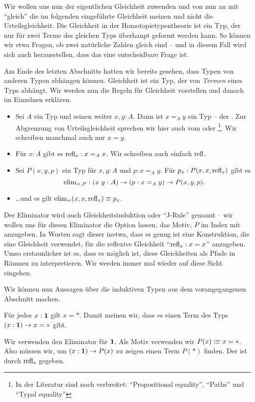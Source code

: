 Wir wollen uns nun der eigentlichen Gleichheit zuwenden und von nun an mit ``gleich'' die im folgenden eingeführte Gleichheit meinen und nicht die Urteilsgleichheit.
Die Gleichheit in der Homotopietypentheorie ist ein Typ, der nur für zwei Terme des gleichen Typs überhaupt geformt werden kann.
So können wir etwa Fragen, ob zwei natürliche Zahlen gleich sind -- und in diesem Fall wird sich auch herausstellen, dass das eine entscheidbare Frage ist.

Am Ende des letzten Abschnitts hatten wir bereits gesehen, dass Typen von anderen Typen abhängen können. Gleichheit ist ein Typ, der von \emph{Termen} eines Typs abhängt.
Wir werden nun die Regeln für Gleichheit vorstellen und danach im Einzelnen erklären.

\begin{regeln}
\begin{itemize}
\item Sei $A$ ein Typ und seinen weiter $x,y:A$. Dann ist $x=_Ay$ ein Typ -- der . Zur Abgrenzung von Urteilsgleichheit sprechen wir hier auch vom  oder \footnote{In der Literatur sind noch verbreitet: ``Propositional equality'', ``Paths'' und ``Typal equality''}. Wir schreiben manchmal auch nur $x=y$.
\item Für $x:A$ gibt es $\mathrm{refl}_x:x=_Ax$. Wir schreiben auch einfach $\mathrm{refl}$.
\item Sei $P(x,y, p)$ ein Typ für $x,y:A$ und $ p:x=_Ay$.
  Für $p_{x}:P(x,x,\mathrm{refl}_x)$ gibt es
  \[
    \elim_{=,P}:(x\ y : A) \to ( p : x=_Ay) \to P(x,y, p)\rlap{.}
  \]
\item \dots und es gilt $\mathrm{elim}_=(x,x,\mathrm{refl}_x)\equiv p_x$.
\end{itemize}
\end{regeln}

Der Eliminator wird auch Gleichheitsinduktion oder ``J-Rule'' genannt -- wir wollen uns für diesen Eliminator die Option lassen, das Motiv, $P$ im Index mit anzugeben.
In Worten sagt dieser inetwa, dass es genug ist eine Konstruktion, die eine Gleichheit verwendet, für die reflexive Gleichheit ``$\mathrm{refl}_x:x=x$'' anzugeben.
Umso erstaunlicher ist es, dass es möglich ist, diese Gleichheiten als Pfade in Räumen zu interpretieren. Wir werden immer mal wieder auf diese Sicht eingehen.

Wir können nun Aussagen über die induktiven Typen aus dem vorangegangenen Abschnitt machen.
\begin{bemerkung}
  Für jedes $x:\mathbf{1}$ gilt $x=\ast$.
  Damit meinen wir, dass es einen Term des Typs $(x:\mathbf{1})\to x=\ast$ gibt.
\end{bemerkung}
\begin{beweis}
  Wir verwenden den Eliminator für $\mathbf{1}$.
  Als Motiv verwenden wir $P(x)\vcentcolon\mspace{-1.2mu}\equiv x=\ast$. Also müssen wir, um $(x:\mathbf{1})\to P(x)$ zu zeigen einen Term $P(\ast)$ finden. Der ist durch $\mathrm{refl}_\ast$ gegeben. 
\end{beweis}


